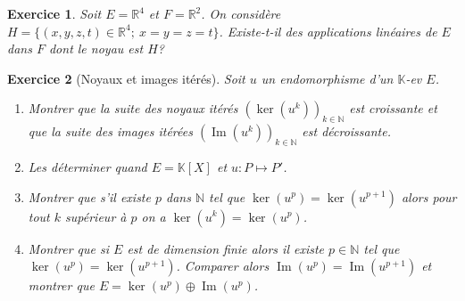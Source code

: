 \documentclass[12pt,a4paper]{article}
\newcommand{\N}{\mathbb{N}}
\newcommand{\K}{\mathbb{K} }
\DeclareMathOperator{\Ima }{Im}
\theoremstyle{break}
\theoremstyle{break}
\newtheorem{Exo}{Exercice}
\begin{document}
\begin{Exo}
	Soit $E=\mathbb R^4$ et $F=\mathbb R^2$. On considère
	$H=\{(x,y,z,t)\in\mathbb R^4;\ x=y=z=t\}$. Existe-t-il des applications linéaires de $E$ dans $F$ dont le noyau est $H$?
\end{Exo}

\begin{Exo}[Noyaux et images itérés]
	Soit $u$ un endomorphisme d'un $\K$-ev $E$.
	\begin{enumerate}
		\item
		Montrer que la suite des noyaux itérés $\left(\ker(u^k)\right)_{k\in\N}$ est croissante et que la suite des images itérées $\left(\Ima(u^k)\right)_{k\in\N}$ est décroissante.
		\item
		Les déterminer quand $E=\K[X]$ et $u:P\mapsto P'$.
		\item
		Montrer que s'il existe $p$ dans $\N$ tel que $\ker(u^p)=\ker(u^{p+1})$ alors pour tout $k$ supérieur à $p$ on a $\ker(u^k)=\ker(u^p)$.
		\item
		Montrer que si $E$ est de dimension finie alors il existe $p\in\N$ tel que $\ker(u^p)=\ker(u^{p+1})$. Comparer alors $\Ima(u^p)=\Ima(u^{p+1})$ et montrer que $E=\ker(u^p)\oplus \Ima(u^p)$.
	\end{enumerate}
\end{Exo}
\end{document}
